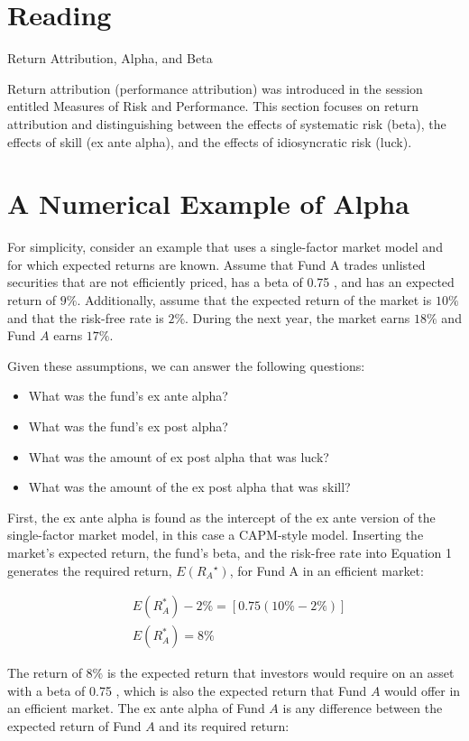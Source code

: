 \documentclass[11pt]{article}
\begin{document}
\section*{Reading}
Return Attribution, Alpha, and Beta

Return attribution (performance attribution) was introduced in the session entitled Measures of Risk and Performance. This section focuses on return attribution and distinguishing between the effects of systematic risk (beta), the effects of skill (ex ante alpha), and the effects of idiosyncratic risk (luck).

\section*{A Numerical Example of Alpha}
For simplicity, consider an example that uses a single-factor market model and for which expected returns are known. Assume that Fund A trades unlisted securities that are not efficiently priced, has a beta of 0.75 , and has an expected return of $9 \%$. Additionally, assume that the expected return of the market is $10 \%$ and that the risk-free rate is $2 \%$. During the next year, the market earns $18 \%$ and Fund $A$ earns $17 \%$.

Given these assumptions, we can answer the following questions:

\begin{itemize}
  \item What was the fund's ex ante alpha?
  \item What was the fund's ex post alpha?
  \item What was the amount of ex post alpha that was luck?
  \item What was the amount of the ex post alpha that was skill?
\end{itemize}

First, the ex ante alpha is found as the intercept of the ex ante version of the single-factor market model, in this case a CAPM-style model. Inserting the market's expected return, the fund's beta, and the risk-free rate into Equation 1 generates the required return, $E\left(R_{A}{ }^{\star}\right)$, for Fund $\mathrm{A}$ in an efficient market:

$$
\begin{aligned}
& E\left(R_{A}^{*}\right)-2 \%=[0.75(10 \%-2 \%)] \\
& E\left(R_{A}^{*}\right)=8 \%
\end{aligned}
$$

The return of $8 \%$ is the expected return that investors would require on an asset with a beta of 0.75 , which is also the expected return that Fund $A$ would offer in an efficient market. The ex ante alpha of Fund $A$ is any difference between the expected return of Fund $A$ and its required return:
\end{document}
